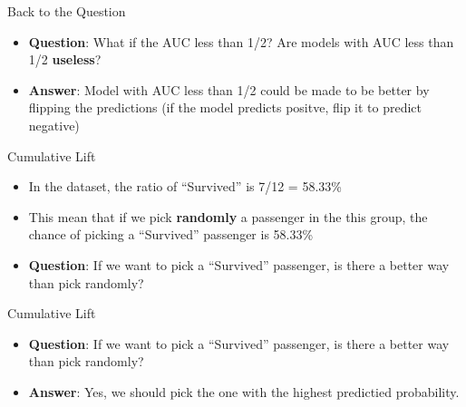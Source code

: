 \documentclass[
  ignorenonframetext,
]{beamer}
\providecommand{\tightlist}{%
  \setlength{\itemsep}{0pt}\setlength{\parskip}{0pt}}
\begin{document}
\begin{frame}{Back to the Question}
\protect\hypertarget{back-to-the-question}{}
\begin{itemize}
\item
  \textbf{Question}: What if the AUC less than 1/2? Are models with AUC
  less than 1/2 \textbf{useless}?
\item
  \textbf{Answer}: Model with AUC less than 1/2 could be made to be
  better by flipping the predictions (if the model predicts positve,
  flip it to predict negative)
\end{itemize}
\end{frame}

\begin{frame}{Cumulative Lift}
\protect\hypertarget{cumulative-lift}{}
\begin{itemize}
\tightlist
\item
  In the dataset, the ratio of ``Survived'' is 7/12 = 58.33\%
\item
  This mean that if we pick \textbf{randomly} a passenger in the this
  group, the chance of picking a ``Survived'' passenger is 58.33\%
\item
  \textbf{Question}: If we want to pick a ``Survived'' passenger, is
  there a better way than pick randomly?
\end{itemize}
\end{frame}

\begin{frame}{Cumulative Lift}
\protect\hypertarget{cumulative-lift-1}{}
\begin{itemize}
\tightlist
\item
  \textbf{Question}: If we want to pick a ``Survived'' passenger, is
  there a better way than pick randomly?
\item
  \textbf{Answer}: Yes, we should pick the one with the highest
  predictied probability.
\end{itemize}
\end{frame}
\end{document}
